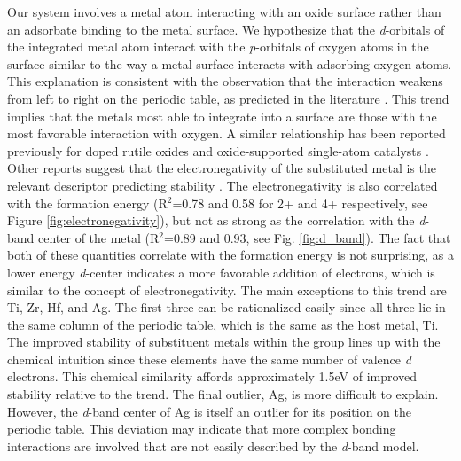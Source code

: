 Our system involves a metal atom interacting with an oxide surface rather than an adsorbate binding to the metal surface. We hypothesize that the \textit{d}-orbitals of the integrated metal atom interact with the \textit{p}-orbitals of oxygen atoms in the surface similar to the way a metal surface interacts with adsorbing oxygen atoms. This explanation is consistent with the observation that the interaction weakens from left to right on the periodic table, as predicted in the literature \cite{Hammer_2000}. This trend implies that the metals most able to integrate into a surface are those with the most favorable interaction with oxygen. A similar relationship has been reported previously for doped rutile oxides \cite{Xu_2015} and oxide-supported single-atom catalysts \cite{O_Connor_2018}. Other reports suggest that the electronegativity of the substituted metal is the relevant descriptor predicting stability \cite{Garc_a_Mota_2011}. The electronegativity is also correlated with the formation energy (R$^2$=0.78 and 0.58 for 2+ and 4+ respectively, see Figure \ref{fig:electronegativity}), but not as strong as the correlation with the \textit{d}-band center of the metal (R$^2$=0.89 and 0.93, see Fig. \ref{fig:d_band}). The fact that both of these quantities correlate with the formation energy is not surprising, as a lower energy \textit{d}-center indicates a more favorable addition of electrons, which is similar to the concept of electronegativity. %
The main exceptions to this trend are Ti, Zr, Hf, and Ag. The first three can be rationalized easily since all three lie in the same column of the periodic table, which is the same as the host metal, Ti. The improved stability of substituent metals within the group lines up with the chemical intuition since these elements have the same number of valence \textit{d} electrons. This chemical similarity affords approximately 1.5eV of improved stability relative to the trend. The final outlier, Ag, is more difficult to explain. However, the \textit{d}-band center of Ag is itself an outlier for its position on the periodic table. This deviation may indicate that more complex bonding interactions are involved that are not easily described by the \textit{d}-band model.

